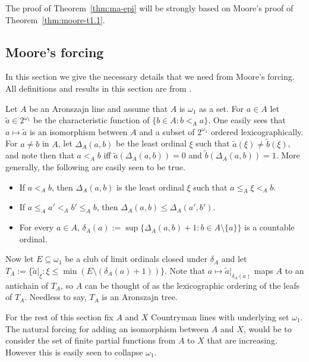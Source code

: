 \documentclass[10pt]{amsart}
\theoremstyle{definition}
\theoremstyle{remark}
\newcommand{\seb}{\subseteq}
\newcommand{\setm}{\setminus}
\newcommand{\1}{\mathbbm{1}}
\begin{document}
The proof of Theorem~\ref{thm:ma-epi} will be strongly based on Moore's
proof of Theorem~\ref{thm:moore-t1.1}.

\subsection{Moore's forcing}\label{sec:moore-forcing}
In this section we give the necessary details that
we need from Moore's forcing. All definitions and results in this
section are from \cite{Moore2009}.

Let $A$ be an Aronszajn line and assume that $A$ is $\omega_{1}$ as a set.
For $a \in A$ let $\tilde{a} \in 2^{\omega_{1}}$ be the characteristic function
of $\{b \in A : b <_{A} a\}$. One easily sees that
$a \mapsto \tilde{a}$ is an isomorphism between $A$ and a subset of $2^{\omega_{1}}$
ordered lexicographically. For $a \neq b$ in $A$, let
$\Delta_{A}(a,b)$ be the least ordinal $\xi$ such that
$\tilde{a}(\xi) \neq \tilde{b}(\xi)$, and note then that
$a <_{A} b$ iff $\tilde{a}(\Delta_{A}(a,b)) = 0$ and $\tilde{b}(\Delta_{A}(a,b)) = 1$.
More generally, the following are easily seen to be true.

\begin{itemize}\itemsep0em
  \item If $a <_{A} b$, then $\Delta_{A}(a,b)$ is the least ordinal $\xi$ such that
  $a \le_{A} \xi <_{A} b$.
  \item If $a \le_{A} a' <_{A} b' \le_{A} b$,
  then $\Delta_{A}(a,b) \le \Delta_{A}(a',b')$.
  \item For every $a \in A$, $\delta_{A}(a) := \sup\{\Delta_{A}(a,b) + 1 : b\in A \setm \{a\}\}$
  is a countable ordinal.
\end{itemize}

Now let $E \seb \omega_{1}$ be a club of limit ordinals
closed under $\delta_{A}$ and let $T_{A} :=
\{\tilde{a}|_{\xi} : \xi \le \min(E\setm (\delta_{A}(a) + 1))\}$.
Note that $a \mapsto \tilde{a}|_{\delta_{A}(a)}$ maps
$A$ to an antichain of $T_{A}$, so $A$ can be thought of as
the lexicographic ordering of the leafs of $T_{A}$.
Needless to say, $T_{A}$ is an Aronszajn tree.

For the rest of this section fix $A$ and $X$ Countryman lines with
underlying set $\omega_{1}$. The natural forcing for adding
an isomorphism between $A$ and $X$, would be to consider
the set of finite partial functions from $A$ to $X$ that
are increasing. However this is easily seen to collapse
$\omega_{1}$.
\end{document}
